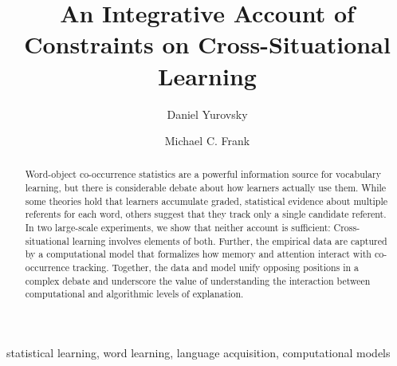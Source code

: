 \documentclass[authoryear,review]{elsarticle}
\begin{document}
\begin{frontmatter}

\title{An Integrative Account of Constraints on Cross-Situational Learning}
\author[dy]{Daniel Yurovsky}

\author[mcf]{Michael C. Frank}

\address{Department of Psychology, Stanford University, United States}

\begin{abstract}
Word-object co-occurrence statistics are a powerful information source for vocabulary learning, but there is considerable debate about how learners actually use them. While some theories hold that learners accumulate graded, statistical evidence about multiple referents for each word, others suggest that they track only a single candidate referent. In two large-scale experiments, we show that neither account is sufficient: Cross-situational learning involves elements of both. Further, the empirical data are captured by a computational model that formalizes how memory and attention interact with co-occurrence tracking. Together, the data and model unify opposing positions in a complex debate and underscore the value of understanding the interaction between computational and algorithmic levels of explanation.
\end{abstract}

\begin{keyword}
statistical learning, word learning, language acquisition, computational models
\end{keyword}

%
\end{frontmatter}

\end{document}
